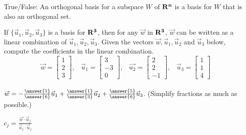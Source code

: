\documentclass{ximera}
\newcommand{\RR}{\bf R}
\begin{document}
  	  		      \begin{question} True/False: An orthogonal basis for a subspace $W$ of $\RR^n$ is a basis for $W$ that is also an orthogonal set.
  	  		      	
  	  		      	\begin{multipleChoice}
  	  		      	\end{multipleChoice}
  	  		      	
  	  		      	
  	  		      \end{question}	
  	  		 \begin{question} 
  	  		 If $\{\vec{u}_1,\vec{u}_2,\vec{u}_3\}$ is a basis for $\RR^3$, then for any $\vec{w}$ in $\RR^3$, $\vec{w}$ can be written as a linear combination of $\vec{u}_1,\vec{u}_2,\vec{u}_3$. Given the vectors $\vec{w},\vec{u}_1,\vec{u}_2$ and $\vec{u}_3$ below, compute the coefficients in the linear combination.\\
  	  		 	
  	  		 $$\vec{w} =\begin{bmatrix} 1\\2\\3\end{bmatrix}, \hspace{10pt} 
\vec{u}_1 =\begin{bmatrix} 3\\-3\\0\end{bmatrix}, \hspace{10pt} 
\vec{u_2} =\begin{bmatrix} 2\\2\\-1\end{bmatrix}, \hspace{10pt} 
\vec{u}_3 =\begin{bmatrix} 1\\1\\4\end{bmatrix}$$
\vspace{10pt}\\
$\vec{w} =- \frac{\answer{1}}{\answer{6}}\vec{u}_1  	 + \frac{\answer{1}}{\answer{3}}\vec{u}_2+ \frac{\answer{5}}{\answer{6}}\vec{u}_3$. \hspace{10pt}	 (Simplify fractions as much as possible.)

\begin{hint}
	$c_j = \frac{\vec{w}\cdot \vec{u}_j}{\vec{u}_j\cdot\vec{u}_j}$
	\end{hint}	 	
  	  		 \end{question}	
\end{document}
